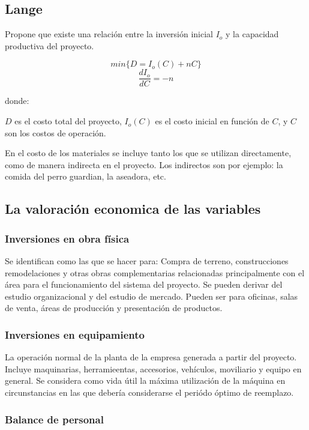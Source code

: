 \documentclass[a4paper, 11pt, oneside]{article}
\begin{document}
\subsection{Lange}

Propone que existe una relación entre la inversión inicial $I_o$ y la capacidad productiva del
proyecto.

	\[min\{D=I_o(C)+nC\}\]
	\[\frac{dI_o}{dC}=-n\]

donde:

$D$ es el costo total del proyecto, $I_o(C)$ es el costo inicial  en función de $C$, y $C$ son
los costos de operación.

En el costo de los materiales se incluye tanto los que se utilizan directamente, como de manera
indirecta en el proyecto. Los indirectos son por ejemplo: la comida del perro guardian, la aseadora,
etc. 

\subsection{La valoración economica de las variables}

\subsubsection{Inversiones en obra física}

Se identifican como las que se hacer para: Compra de terreno, construcciones remodelaciones y otras obras 
complementarias relacionadas principalmente con el área para el funcionamiento del sistema del proyecto. Se 
pueden derivar del estudio organizacional y del estudio de mercado. Pueden ser para oficinas, salas de venta,
áreas de producción y presentación de productos.

\subsubsection{Inversiones en equipamiento}

La operación normal de la planta de la empresa generada a partir del proyecto. Incluye maquinarias, 
herramieentas, accesorios, vehículos, moviliario y equipo en general. Se considera como vida útil la
máxima utilización de la máquina en circunstancias en las que debería considerarse el periódo óptimo de reemplazo.

\subsubsection{Balance de personal}
\end{document}
